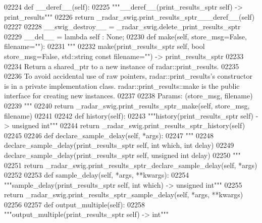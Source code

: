 \begin{DoxyCode}
{{{{{{{{{02224     \textcolor{keyword}{def }__deref__(self):
02225         \textcolor{stringliteral}{"""\_\_deref\_\_(print\_results\_sptr self) -> print\_results"""}
02226         \textcolor{keywordflow}{return} \_radar\_swig.print\_results\_sptr\_\_\_deref\_\_(self)
02227 
02228     \_\_swig\_destroy\_\_ = \_radar\_swig.delete\_print\_results\_sptr
02229     \_\_del\_\_ = \textcolor{keyword}{lambda} self : \textcolor{keywordtype}{None};
02230     \textcolor{keyword}{def }make(self, store\_msg=False, filename=""):
02231         \textcolor{stringliteral}{"""}
02232 \textcolor{stringliteral}{        make(print\_results\_sptr self, bool store\_msg=False, std::string const filename="") ->
       print\_results\_sptr}
02233 \textcolor{stringliteral}{}
02234 \textcolor{stringliteral}{        Return a shared\_ptr to a new instance of radar::print\_results.}
02235 \textcolor{stringliteral}{}
02236 \textcolor{stringliteral}{        To avoid accidental use of raw pointers, radar::print\_results's constructor is in a private
       implementation class. radar::print\_results::make is the public interface for creating new instances.}
02237 \textcolor{stringliteral}{}
02238 \textcolor{stringliteral}{        Params: (store\_msg, filename)}
02239 \textcolor{stringliteral}{        """}
02240         \textcolor{keywordflow}{return} \_radar\_swig.print\_results\_sptr\_make(self, store\_msg, filename)
02241 
02242     \textcolor{keyword}{def }history(self):
02243         \textcolor{stringliteral}{"""history(print\_results\_sptr self) -> unsigned int"""}
02244         \textcolor{keywordflow}{return} \_radar\_swig.print\_results\_sptr\_history(self)
02245 
02246     \textcolor{keyword}{def }declare_sample_delay(self, *args):
02247         \textcolor{stringliteral}{"""}
02248 \textcolor{stringliteral}{        declare\_sample\_delay(print\_results\_sptr self, int which, int delay)}
02249 \textcolor{stringliteral}{        declare\_sample\_delay(print\_results\_sptr self, unsigned int delay)}
02250 \textcolor{stringliteral}{        """}
02251         \textcolor{keywordflow}{return} \_radar\_swig.print\_results\_sptr\_declare\_sample\_delay(self, *args)
02252 
02253     \textcolor{keyword}{def }sample_delay(self, *args, **kwargs):
02254         \textcolor{stringliteral}{"""sample\_delay(print\_results\_sptr self, int which) -> unsigned int"""}
02255         \textcolor{keywordflow}{return} \_radar\_swig.print\_results\_sptr\_sample\_delay(self, *args, **kwargs)
02256 
02257     \textcolor{keyword}{def }output_multiple(self):
02258         \textcolor{stringliteral}{"""output\_multiple(print\_results\_sptr self) -> int"""}
}}}}}}}}}
\end{DoxyCode}
